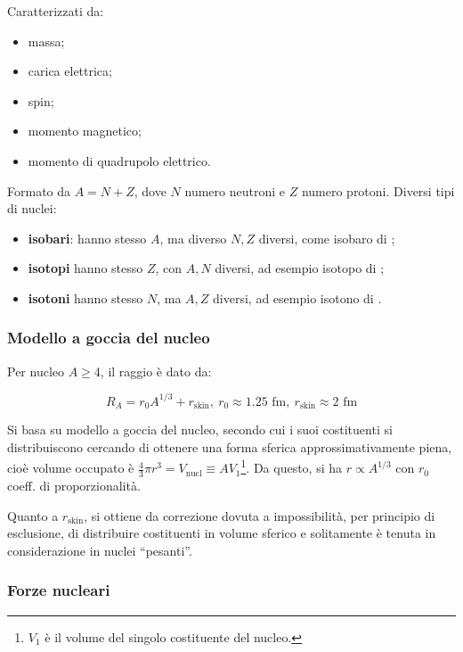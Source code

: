 \documentclass[10pt, a4paper]{scrartcl}
\numberwithin{equation}{subsection}
\theoremstyle{style1}
\newenvironment{boxenv}[1][]{
    \begin{eqbox}[#1]
    }{
   \end{eqbox}
}
\begin{document}
Caratterizzati da:
\begin{itemize}
	\item massa;
	\item carica elettrica;
	\item spin;
	\item momento magnetico;
	\item momento di quadrupolo elettrico.
\end{itemize}
Formato da $A = N +Z$, dove $N$ numero neutroni e $Z$ numero protoni. Diversi tipi di nuclei: 
\begin{itemize}
	\item \textbf{isobari}: hanno stesso $A$, ma diverso $N,Z$ diversi, come  isobaro di ;
	\item \textbf{isotopi} hanno stesso $Z$, con $A,N$ diversi, ad esempio  isotopo di ;
	\item \textbf{isotoni} hanno stesso $N$, ma $A,Z$ diversi, ad esempio  isotono di . 
\end{itemize}
\subsubsection{Modello a goccia del nucleo}

Per nucleo $A\ge 4$, il raggio \`e dato da:
\begin{boxenv}[]
\begin{equation}
	R_A = r_0 A^{1 / 3}  + r_\text{skin}, \ r_0 \approx 1.25 \text{ fm} , \ r_\text{skin}\approx 2 \text{ fm}
\end{equation}
\end{boxenv}
\noindent Si basa su modello a goccia del nucleo, secondo cui i suoi costituenti si distribuiscono cercando di ottenere una forma sferica approssimativamente piena, cio\`e volume occupato \`e $\frac{4}{3}\pi r^3 = V_\text{nucl}\equiv A V_1$\footnote{$V_1$ \`e il volume del singolo costituente del nucleo.}. Da questo, si ha $r\propto A^{1 / 3} $ con $r_0$ coeff. di proporzionalit\`a. 

Quanto a $r_\text{skin}$, si ottiene da correzione dovuta a impossibilit\`a, per principio di esclusione, di distribuire costituenti in volume sferico e solitamente \`e tenuta in considerazione in nuclei ``pesanti''.

\subsubsection{Forze nucleari}
\end{document}
